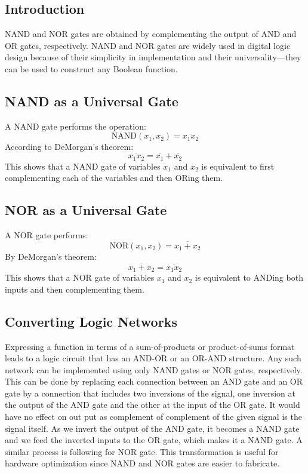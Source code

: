 \documentclass{article}
\begin{document}
\subsection{Introduction}
NAND and NOR gates are obtained by complementing the output of AND and OR gates, respectively. NAND and NOR gates are widely used in digital logic design because of their simplicity in implementation and their universality—they can be used to construct any Boolean function.

\subsection{NAND as a Universal Gate}
A NAND gate performs the operation:
\[
\text{NAND}(x_1, x_2) = \overline{x_1 x_2}
\]
According to DeMorgan's theorem:
\[
\overline{x_1 x_2} = \overline{x_1} + \overline{x_2}
\]
This shows that a NAND gate of variables $x_1$ and $x_2$ is equivalent to first complementing each of the variables and then ORing them.

\subsection{NOR as a Universal Gate}
A NOR gate performs:
\[
\text{NOR}(x_1, x_2) = \overline{x_1 + x_2}
\]
By DeMorgan's theorem:
\[
\overline{x_1+x_2} = \overline{x_1 x_2}
\]
This shows that a NOR gate of variables $x_1$ and $x_2$ is equivalent to ANDing both inputs and then complementing them.
\subsection{Converting Logic Networks}
Expressing a function in terms of a sum-of-products or product-of-sums format leads to a logic circuit that has an AND-OR or an OR-AND structure. Any such network can be implemented using only NAND gates or NOR gates, respectively. This can be done by replacing each connection between an AND gate and an OR gate by a connection that includes two inversions of the signal, one inversion at the output of the AND gate and the other at the input of the OR gate. It would have no effect on out put as complement of complement of the given signal is the signal itself. As we invert the output of the AND gate, it becomes a NAND gate and we feed the inverted inputs to the OR gate, which makes it a NAND gate. A similar process is following for NOR gate. This transformation is useful for hardware optimization since NAND and NOR gates are easier to fabricate.
\end{document}
